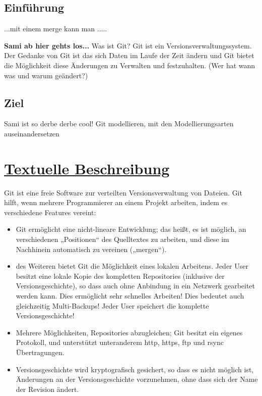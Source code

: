 \documentclass[a4paper]{article}
\begin{document}
\subsection{Einführung} 								%

...mit einem \gls{merge} kann man .....    				%

	\textbf{Sami ab hier gehts los...} 					%
Was ist Git? Git ist ein Versionsverwaltungssystem. 	
Der Gedanke von Git ist das sich Daten im Laufe der Zeit ändern und Git bietet die Möglichkeit
diese Änderungen zu Verwalten und festzuhalten. (Wer hat wann was und warum geändert?)

\subsection{Ziel}
	Sami ist so derbe derbe cool!
	Git modellieren, mit den Modellierungsarten auseinandersetzen	
\newpage												%
\section{\underline{Textuelle Beschreibung}}

Git ist eine freie Software zur verteilten Versionsverwaltung von Dateien. Git hilft, wenn mehrere Programmierer an einem Projekt arbeiten, indem es verschiedene Features vereint:

  \begin{itemize} 										%
     
\item Git ermöglicht eine nicht-lineare Entwicklung; das heißt, es ist möglich, an verschiedenen „Positionen“ des Quelltextes zu arbeiten, und diese im Nachhinein automatisch zu vereinen („mergen“). %
\item des Weiteren bietet Git die Möglichkeit eines lokalen Arbeitens. Jeder User besitzt eine lokale Kopie des kompletten Repositories (inklusive der Versionsgeschichte), so dass auch ohne Anbindung in ein Netzwerk gearbeitet werden kann. Dies ermöglicht sehr schnelles Arbeiten!
Dies bedeutet auch gleichzeitig Multi-Backups! Jeder User speichert die komplette Versionsgeschichte!
\item Mehrere Möglichkeiten, Repositories abzugleichen; Git besitzt ein eigenes Protokoll, und unterstützt unteranderem http, https, ftp und rsync Übertragungen.
\item Versionsgeschichte wird kryptografisch gesichert, so dass es nicht möglich ist, Änderungen an der Versionsgeschichte vorzunehmen, ohne dass sich der Name der Revision ändert.

    \end{itemize} 										%
\end{document}
